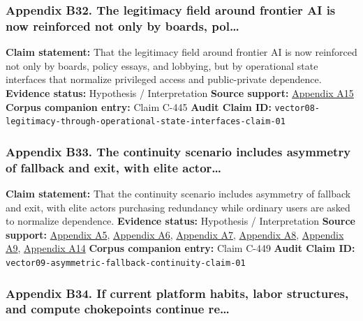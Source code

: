 \documentclass[
  american,
  11pt,
  letterpaper,
]{article}
\begin{document}
\subsubsection{Appendix B32. The legitimacy field around frontier AI is
now reinforced not only by boards,
pol\ldots{}}\label{appendix-b32-the-legitimacy-field-around-frontier-ai-is-now-reinforced-not-only-by-boards-pol}

\textbf{Claim statement:} That the legitimacy field around frontier AI
is now reinforced not only by boards, policy essays, and lobbying, but
by operational state interfaces that normalize privileged access and
public-private dependence. \textbf{Evidence status:} Hypothesis /
Interpretation \textbf{Source support:}
\hyperref[appendix-a15-openais-proposals-for-the-us-ai-action-plan]{Appendix
A15} \textbf{Corpus companion entry:} Claim C-445 \textbf{Audit Claim
ID:}
\texttt{vector08-legitimacy-through-operational-state-interfaces-claim-01}

\subsubsection{Appendix B33. The continuity scenario includes asymmetry
of fallback and exit, with elite
actor\ldots{}}\label{appendix-b33-the-continuity-scenario-includes-asymmetry-of-fallback-and-exit-with-elite-actor}

\textbf{Claim statement:} That the continuity scenario includes
asymmetry of fallback and exit, with elite actors purchasing redundancy
while ordinary users are asked to normalize dependence. \textbf{Evidence
status:} Hypothesis / Interpretation \textbf{Source support:}
\hyperref[appendix-a5-sam-altman-s-manifest-destiny]{Appendix A5},
\hyperref[appendix-a6-inside-mark-zuckerbergs-top-secret-hawaii-compound]{Appendix
A6},
\hyperref[appendix-a7-mark-zuckerberg-downplays-his-5-000-square-foot-underground-bunker-in-hawaii-just-a-little-shelter]{Appendix
A7},
\hyperref[appendix-a8-why-silicon-valley-billionaires-are-prepping-for-the-apocalypse-in-new-zealand]{Appendix
A8},
\hyperref[appendix-a9-new-zealand-woos-the-wealthy-with-golden-visa-changes]{Appendix
A9}, \hyperref[appendix-a14-the-digital-sovereignty-imperative]{Appendix
A14} \textbf{Corpus companion entry:} Claim C-449 \textbf{Audit Claim
ID:} \texttt{vector09-asymmetric-fallback-continuity-claim-01}

\subsubsection{Appendix B34. If current platform habits, labor
structures, and compute chokepoints continue
re\ldots{}}\label{appendix-b34-if-current-platform-habits-labor-structures-and-compute-chokepoints-continue-re}
\end{document}
